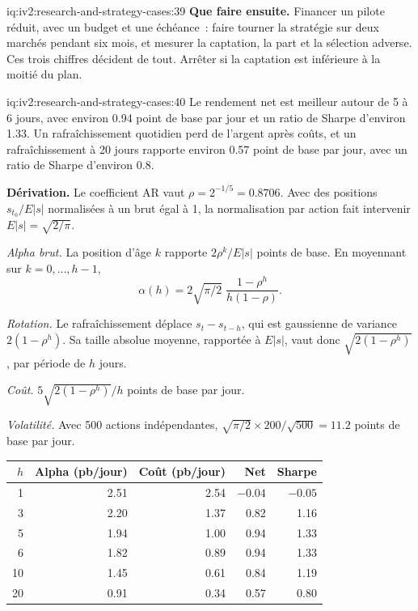 \begin{solution}{iq:iv2:research-and-strategy-cases:39}
\textbf{Que faire ensuite.} Financer un pilote réduit, avec un budget et une échéance~: faire tourner la stratégie sur deux marchés pendant six mois, et mesurer la captation, la part et la sélection adverse. Ces trois chiffres décident de tout. Arrêter si la captation est inférieure à la moitié du plan.

\end{solution}

\begin{solution}{iq:iv2:research-and-strategy-cases:40}
Le rendement net est meilleur autour de 5 à 6 jours, avec environ 0.94 point de base par jour et un ratio de Sharpe d'environ 1.33. Un rafraîchissement quotidien perd de l'argent après coûts, et un rafraîchissement à 20 jours rapporte environ 0.57 point de base par jour, avec un ratio de Sharpe d'environ 0.8.

\textbf{Dérivation.} Le coefficient AR vaut $\rho = 2^{-1/5} = 0.8706$. Avec des positions $s_{t_0}/E|s|$ normalisées à un brut égal à 1, la normalisation par action fait intervenir $E|s| = \sqrt{2/\pi}$.

\textit{Alpha brut.} La position d'âge $k$ rapporte $2\rho^k/E|s|$ points de base. En moyennant sur $k = 0, \dots, h - 1$,
\[
\alpha(h) = 2\sqrt{\pi/2}\;\frac{1 - \rho^h}{h(1 - \rho)}.
\]

\textit{Rotation.} Le rafraîchissement déplace $s_{t} - s_{t-h}$, qui est gaussienne de variance $2(1 - \rho^h)$. Sa taille absolue moyenne, rapportée à $E|s|$, vaut donc $\sqrt{2(1 - \rho^h)}$, par période de $h$ jours.

\textit{Coût.} $5\sqrt{2(1 - \rho^h)}/h$ points de base par jour.

\textit{Volatilité.} Avec 500 actions indépendantes, $\sqrt{\pi/2} \times 200/\sqrt{500} = 11.2$ points de base par jour.

\begin{center}
\begin{tabular}{rrrrr}
\toprule
$h$ & Alpha (pb/jour) & Coût (pb/jour) & Net & Sharpe \\
\midrule
1 & 2.51 & 2.54 & $-0.04$ & $-0.05$ \\
3 & 2.20 & 1.37 & 0.82 & 1.16 \\
5 & 1.94 & 1.00 & 0.94 & 1.33 \\
6 & 1.82 & 0.89 & 0.94 & 1.33 \\
10 & 1.45 & 0.61 & 0.84 & 1.19 \\
20 & 0.91 & 0.34 & 0.57 & 0.80 \\
\bottomrule
\end{tabular}
\end{center}


\end{solution}
